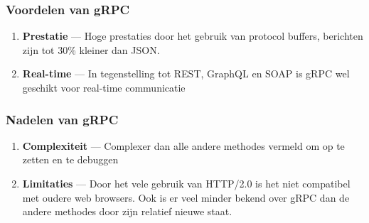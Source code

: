 \subsubsection{Voordelen van gRPC}
\begin{enumerate}
    \item \textbf{Prestatie} --- Hoge prestaties door het gebruik van protocol
     buffers, berichten zijn tot 30\% kleiner dan JSON.
    \item \textbf{Real-time} --- In tegenstelling tot REST, GraphQL en SOAP
     is gRPC wel geschikt voor real-time communicatie
\end{enumerate}

\subsubsection{Nadelen van gRPC}
\begin{enumerate}
    \item \textbf{Complexiteit} --- Complexer dan alle andere methodes vermeld
     om op te zetten en te debuggen
     \item \textbf{Limitaties} --- Door het vele gebruik van HTTP/2.0 is het niet
      compatibel met oudere web browsers. Ook is er veel minder bekend over gRPC
      dan de andere methodes door zijn relatief nieuwe staat.
\end{enumerate}
